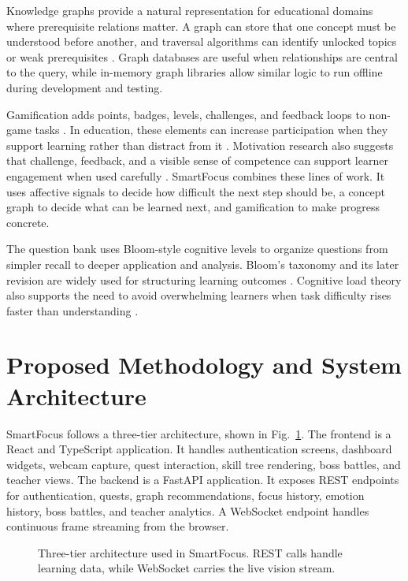 \documentclass[conference]{IEEEtran}
\begin{document}
Knowledge graphs provide a natural representation for educational domains where prerequisite relations matter. A graph can store that one concept must be understood before another, and traversal algorithms can identify unlocked topics or weak prerequisites \cite{pan2017prerequisite}. Graph databases are useful when relationships are central to the query, while in-memory graph libraries allow similar logic to run offline during development and testing.

Gamification adds points, badges, levels, challenges, and feedback loops to non-game tasks \cite{deterding2011gamification}. In education, these elements can increase participation when they support learning rather than distract from it \cite{hamari2014gamification}. Motivation research also suggests that challenge, feedback, and a visible sense of competence can support learner engagement when used carefully \cite{ryan2000self}. SmartFocus combines these lines of work. It uses affective signals to decide how difficult the next step should be, a concept graph to decide what can be learned next, and gamification to make progress concrete.

The question bank uses Bloom-style cognitive levels to organize questions from simpler recall to deeper application and analysis. Bloom's taxonomy and its later revision are widely used for structuring learning outcomes \cite{bloom1956taxonomy,anderson2001taxonomy}. Cognitive load theory also supports the need to avoid overwhelming learners when task difficulty rises faster than understanding \cite{sweller1988cognitive}.

\section{Proposed Methodology and System Architecture}

SmartFocus follows a three-tier architecture, shown in Fig.~\ref{fig:architecture}. The frontend is a React and TypeScript application. It handles authentication screens, dashboard widgets, webcam capture, quest interaction, skill tree rendering, boss battles, and teacher views. The backend is a FastAPI application. It exposes REST endpoints for authentication, quests, graph recommendations, focus history, emotion history, boss battles, and teacher analytics. A WebSocket endpoint handles continuous frame streaming from the browser.

\begin{figure}[!htbp]
  \centering
  \resizebox{\columnwidth}{!}{}
  \caption{Three-tier architecture used in SmartFocus. REST calls handle learning data, while WebSocket carries the live vision stream.}
  \label{fig:architecture}
\end{figure}
\end{document}
